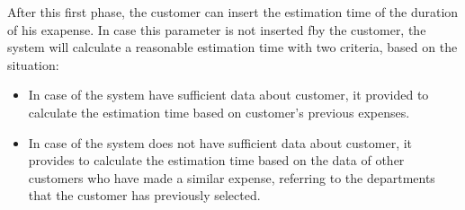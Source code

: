 \documentclass{article}
\begin{document}
		After this first phase, the customer can insert the estimation time of the duration of his exapense. In case this parameter is not inserted fby the customer, the system will calculate a reasonable estimation time with two criteria, based on the situation:
		\begin{itemize}
			\item In case of the system have sufficient data about customer, it provided to calculate the estimation time based on customer's previous expenses.
			\item In case of the system does not have sufficient data about customer, it provides to calculate the estimation time based on the data of other customers who have made a similar expense, referring to the departments that the customer has previously selected.
		\end{itemize}
	
\end{document}
